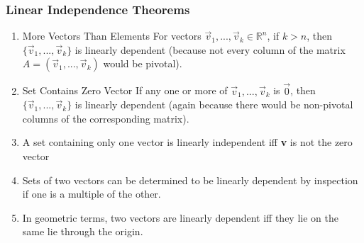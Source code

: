 \documentclass[12pt]{article} %
\newcommand{\R}{\mathbb{R}}
\begin{document}
\subsubsection{Linear Independence Theorems}
\begin{enumerate}
	\item More Vectors Than Elements
		\indent For vectors $\vec{v}_1, ..., \vec{v}_k \in \R^n$, if $k > n$, then $\{\vec{v}_1, ..., \vec{v}_k\}$ is linearly dependent (because not every column of the matrix $A = (\vec{v}_1, ..., \vec{v}_k)$ would be pivotal). 
	\item Set Contains Zero Vector
		\indent If any one or more of $\vec{v}_1, ..., \vec{v}_k$ is $\vec{0}$, then $\{\vec{v}_1, ..., \vec{v}_k\}$ is linearly dependent (again because there would be non-pivotal columns of the corresponding matrix).
	\item A set containing only one vector is linearly independent iff \textbf{v} is not the zero vector
	\item Sets of two vectors can be determined to be linearly dependent by inspection if one is a multiple of the other.
	\item In geometric terms, two vectors are linearly dependent iff they lie on the same lie through the origin.
\end{enumerate}
\end{document}
